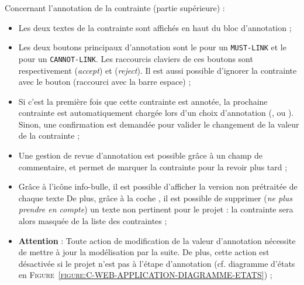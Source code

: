 			Concernant l'annotation de la contrainte (partie supérieure) :
			\begin{itemize}
				\item Les deux textes de la contrainte sont affichés en haut du bloc d'annotation ;
				\item Les deux boutons principaux d'annotation sont le \textguillemets{\textcolor{colorApplicationMUSTLINK}{\faEquals}} pour un \texttt{MUST-LINK} et le \textguillemets{\textcolor{colorApplicationCANNOTLINK}{\faNotEqual}} pour un \texttt{CANNOT-LINK}.
				Les raccourcis claviers de ces boutons sont respectivement  (\textit{accept}) et  (\textit{reject}).
				Il est aussi possible d'ignorer la contrainte avec le bouton \textguillemets{\textcolor{colorApplicationSKIP}{\faQuestion}} (raccourci avec la barre espace) ;
				\item Si c'est la première fois que cette contrainte est annotée, la prochaine contrainte est automatiquement chargée lors d'un choix d'annotation (\textguillemets{\textcolor{colorApplicationMUSTLINK}{\faEquals}}, \textguillemets{\textcolor{colorApplicationCANNOTLINK}{\faNotEqual}} ou \textguillemets{\textcolor{colorApplicationSKIP}{\faQuestion}}).
				Sinon, une confirmation est demandée pour valider le changement de la valeur de la contrainte ;
				\item Une gestion de revue d'annotation est possible grâce à un champ de commentaire, et \textguillemets{\textcolor{colorApplicationREVIEW}{\faCheckSquare}} permet de marquer la contrainte pour la revoir plus tard ;
				\item Grâce à l'icône info-bulle, il est possible d'afficher la version non prétraitée de chaque texte
				De plus, grâce à la coche \textguillemets{\textcolor{colorApplicationDELETE}{\faTrash}}, il est possible de supprimer (\textit{ne plus prendre en compte}) un texte non pertinent pour le projet : la contrainte sera alors masquée de la liste des contraintes ;
				\item \textbf{Attention} : Toute action de modification de la valeur d'annotation nécessite de mettre à jour la modélisation par la suite.
				De plus, cette action est désactivée si le projet n'est pas à l'étape d'annotation (cf. diagramme d'états en \textsc{Figure~\ref{figure:C-WEB-APPLICATION-DIAGRAMME-ETATS}}) ;
			\end{itemize}
			
